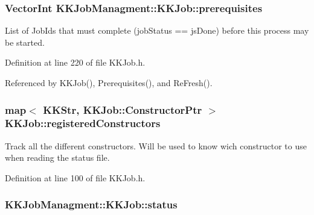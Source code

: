 \subsubsection[{\texorpdfstring{prerequisites}{prerequisites}}]{\setlength{\rightskip}{0pt plus 5cm}Vector\+Int K\+K\+Job\+Managment\+::\+K\+K\+Job\+::prerequisites\hspace{0.3cm}{\ttfamily [protected]}}\hypertarget{class_k_k_job_managment_1_1_k_k_job_afdcceeddf9e01d31a2359901ad661b9b}{}\label{class_k_k_job_managment_1_1_k_k_job_afdcceeddf9e01d31a2359901ad661b9b}
List of Job\+Id\textquotesingle{}s that must complete (job\+Status == js\+Done) before this process may be started. 

Definition at line 220 of file K\+K\+Job.\+h.



Referenced by K\+K\+Job(), Prerequisites(), and Re\+Fresh().

\subsubsection[{\texorpdfstring{registered\+Constructors}{registeredConstructors}}]{\setlength{\rightskip}{0pt plus 5cm}map$<$ K\+K\+Str, {\bf K\+K\+Job\+::\+Constructor\+Ptr} $>$ K\+K\+Job\+::registered\+Constructors\hspace{0.3cm}{\ttfamily [static]}}\hypertarget{class_k_k_job_managment_1_1_k_k_job_ad05284b793718e8796f2e11c7aafadc2}{}\label{class_k_k_job_managment_1_1_k_k_job_ad05284b793718e8796f2e11c7aafadc2}
Track all the different constructors. Will be used to know wich constructor to use when reading the status file. 

Definition at line 100 of file K\+K\+Job.\+h.

\subsubsection[{\texorpdfstring{status}{status}}]{ K\+K\+Job\+Managment\+::\+K\+K\+Job\+::status\hspace{0.3cm}{\ttfamily [protected]}}\hypertarget{class_k_k_job_managment_1_1_k_k_job_a7d47b57d658db4208037511f7f663be9}{}\label{class_k_k_job_managment_1_1_k_k_job_a7d47b57d658db4208037511f7f663be9}


